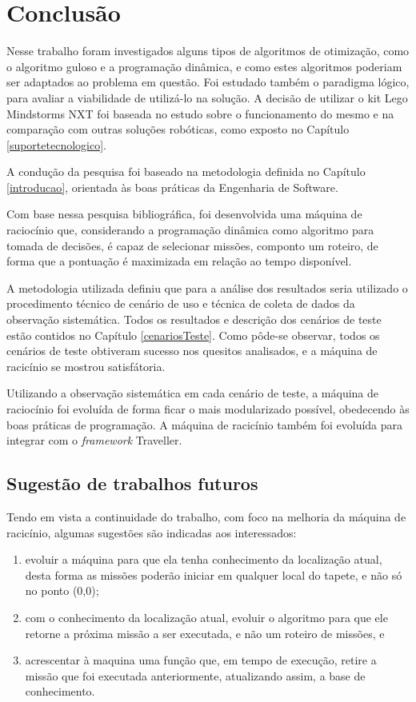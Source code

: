 \chapter{Conclusão}
	Nesse trabalho foram investigados alguns tipos de algoritmos de otimização, como o algoritmo guloso e a programação dinâmica, e como estes algoritmos poderiam ser adaptados ao problema em questão. Foi estudado também o paradigma lógico, para avaliar a viabilidade de utilizá-lo na solução. A decisão de utilizar o kit Lego Mindstorms NXT foi baseada no estudo sobre o funcionamento do mesmo e na comparação com outras soluções robóticas, como exposto no Capítulo \ref{suportetecnologico}.

	A condução da pesquisa foi baseado na metodologia definida no Capítulo \ref{introducao}, orientada às boas práticas da Engenharia de Software. 
		
	Com base nessa pesquisa bibliográfica, foi desenvolvida uma máquina de raciocínio que, considerando a programação dinâmica como algoritmo para tomada de decisões, é capaz de selecionar missões, componto um roteiro, de forma que a pontuação é maximizada em relação ao tempo disponível.

	A metodologia utilizada definiu que para a análise dos resultados seria utilizado o procedimento técnico de cenário de uso e técnica de coleta de dados da observação sistemática. Todos os resultados e descrição dos cenários de teste estão contidos no Capítulo \ref{cenariosTeste}. Como pôde-se observar, todos os cenários de teste obtiveram sucesso nos quesitos analisados, e a máquina de racicínio se mostrou satisfátoria.
	
	Utilizando a observação sistemática em cada cenário de teste, a máquina de raciocínio foi evoluída de forma ficar o mais modularizado possível, obedecendo às boas práticas de programação. A máquina de racicínio também foi evoluída para integrar com o \textit{framework} Traveller.
	
\section{Sugestão de trabalhos futuros}
	Tendo em vista a continuidade do trabalho, com foco na melhoria da máquina de racicínio, algumas sugestões são indicadas aos interessados:
	\begin{enumerate}
	\item evoluir a máquina para que ela tenha conhecimento da localização atual, desta forma as missões poderão iniciar em qualquer local do tapete, e não só no ponto (0,0);
	\item com o conhecimento da localização atual, evoluir o algoritmo para que ele retorne a próxima missão a ser executada, e não um roteiro de missões, e
	\item acrescentar à maquina uma função que, em tempo de execução, retire a missão que foi executada anteriormente, atualizando assim, a base de conhecimento.
	\end{enumerate}